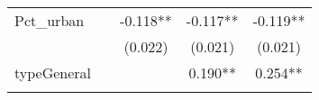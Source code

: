 \documentclass[12pt,twoside]{reedthesis}
\begin{document}
\begin{longtable}[]{@{}lcccc@{}}
  \begin{minipage}[t]{0.26\columnwidth}\raggedright\strut
  Pct\_urban\strut
  \end{minipage} & \begin{minipage}[t]{0.12\columnwidth}\centering\strut
  \strut
  \end{minipage} & \begin{minipage}[t]{0.13\columnwidth}\centering\strut
  -0.118**\strut
  \end{minipage} & \begin{minipage}[t]{0.14\columnwidth}\centering\strut
  -0.117**\strut
  \end{minipage} & \begin{minipage}[t]{0.14\columnwidth}\centering\strut
  -0.119**\strut
  \end{minipage}\tabularnewline
  \begin{minipage}[t]{0.26\columnwidth}\raggedright\strut
  \strut
  \end{minipage} & \begin{minipage}[t]{0.12\columnwidth}\centering\strut
  \strut
  \end{minipage} & \begin{minipage}[t]{0.13\columnwidth}\centering\strut
  (0.022)\strut
  \end{minipage} & \begin{minipage}[t]{0.14\columnwidth}\centering\strut
  (0.021)\strut
  \end{minipage} & \begin{minipage}[t]{0.14\columnwidth}\centering\strut
  (0.021)\strut
  \end{minipage}\tabularnewline
  \begin{minipage}[t]{0.26\columnwidth}\raggedright\strut
  typeGeneral\strut
  \end{minipage} & \begin{minipage}[t]{0.12\columnwidth}\centering\strut
  \strut
  \end{minipage} & \begin{minipage}[t]{0.13\columnwidth}\centering\strut
  \strut
  \end{minipage} & \begin{minipage}[t]{0.14\columnwidth}\centering\strut
  0.190**\strut
  \end{minipage} & \begin{minipage}[t]{0.14\columnwidth}\centering\strut
  0.254**\strut
  \end{minipage}\tabularnewline
  \begin{minipage}[t]{0.26\columnwidth}\raggedright\strut

\end{minipage}
\end{longtable}
\end{document}
